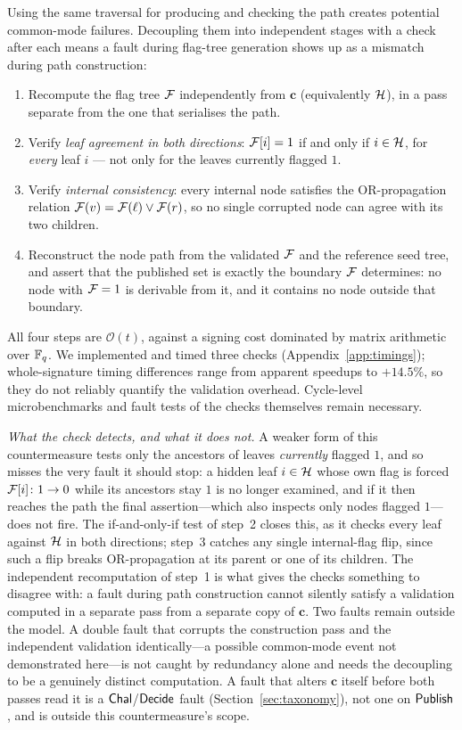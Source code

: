 Using the same traversal for producing and checking the path creates
potential common-mode failures. Decoupling them into independent stages with a check after
each means a fault during flag-tree generation shows up as a mismatch during
path construction:

\begin{enumerate}
\item Recompute the flag tree $\mathcal{F}$ independently from $\mathbf{c}$
(equivalently $\mathcal{H}$), in a pass separate from the one that serialises the
path.
\item Verify \emph{leaf agreement in both directions}: $\mathcal{F}[i]=1$ if and
only if $i\in\mathcal{H}$, for \emph{every} leaf $i$ --- not only for the leaves
currently flagged $1$.
\item Verify \emph{internal consistency}: every internal node satisfies
the OR-propagation relation $\mathcal{F}(v)=\mathcal{F}(\ell)\vee\mathcal{F}(r)$, so no single
corrupted node can agree with its two children.
\item Reconstruct the node path from the validated $\mathcal{F}$ and the
reference seed tree, and assert that the published set is exactly the boundary
$\mathcal{F}$ determines: no node with $\mathcal{F}=1$ is derivable from it, and it contains
no node outside that boundary.
\end{enumerate}

All four steps are $\mathcal{O}(t)$, against a signing cost dominated by
matrix arithmetic over $\mathbb{F}_q$. We implemented and timed three checks
(Appendix~\ref{app:timings}); whole-signature timing differences range
from apparent speedups to $+14.5\%$, so they do not reliably quantify the
validation overhead. Cycle-level microbenchmarks and fault tests of the
checks themselves remain necessary.

\noindent\textit{What the check detects, and what it does not.} A weaker
form of this countermeasure tests only the ancestors of leaves \emph{currently}
flagged $1$, and so misses the very fault it should stop: a hidden leaf
$i\in\mathcal{H}$ whose own flag is forced $\mathcal{F}[i]\colon 1\to 0$ while its ancestors
stay $1$ is no longer examined, and if it then reaches the path the final
assertion---which also inspects only nodes flagged $1$---does not fire. The
if-and-only-if test of step~2 closes this, as it checks every leaf against
$\mathcal{H}$ in both directions; step~3 catches any single internal-flag flip, since
such a flip breaks OR-propagation at its parent or one of its children. The
independent recomputation of step~1 is what gives the checks something to
disagree with: a fault during path construction cannot silently satisfy a
validation computed in a separate pass from a separate copy of $\mathbf{c}$.
Two faults remain outside the model. A double fault that corrupts the
construction pass and the independent validation identically---a possible common-mode event not demonstrated here---is not caught by redundancy
alone and needs the decoupling to be a genuinely distinct computation. A fault
that alters $\mathbf{c}$ itself before both passes read it is a
$\mathsf{Chal}$/$\mathsf{Decide}$ fault (Section~\ref{sec:taxonomy}), not one on $\mathsf{Publish}$, and
is outside this countermeasure's scope.

